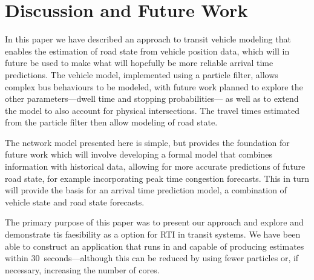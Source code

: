 \section{Discussion and Future Work}
\label{sec:discussion}

In this paper we have described an approach to transit vehicle modeling
that enables the \rt estimation of road state from vehicle position data,
which will in future be used to make what will hopefully be more reliable 
arrival time predictions.
The vehicle model, implemented using a particle filter,
allows complex bus behaviours to be modeled,
with future work planned to explore the other parameters---dwell time and stopping probabilities---%
as well as to extend the model to also account for physical intersections.
The travel times estimated from the particle filter then allow modeling of
\rt road state.


The network model presented here is simple,
but provides the foundation for future work which will involve
developing a formal model that combines \rt information with
historical data, allowing for more accurate predictions of future road state,
for example incorporating peak time congestion forecasts.
This in turn will provide the basis for an arrival time prediction model,
a combination of vehicle state and road state forecasts.


The primary purpose of this paper was to present our approach and 
explore and demonstrate tis faesibility as a \rt option for RTI in transit systems.
We have been able to construct an application that runs in \rt and capable
of producing estimates within 30~seconds---although this can be reduced 
by using fewer particles or, if necessary, increasing the number of cores.






